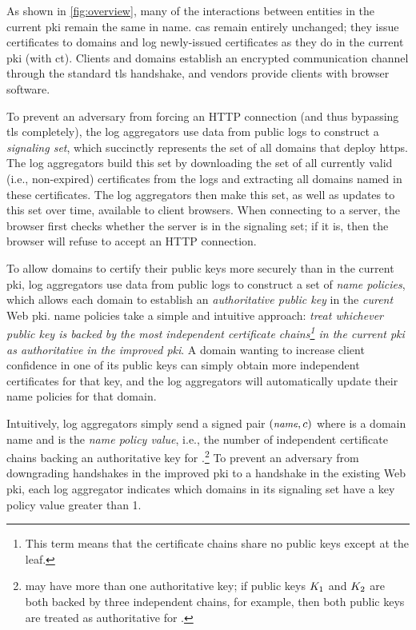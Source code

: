 As shown in \autoref{fig:overview}, many of the interactions between entities in
the current \ac{pki} remain the same in \ac{name}. \acp{ca} remain entirely unchanged;
they issue certificates
to domains and log newly-issued certificates as they do in the current \ac{pki}
(with \ac{ct}). Clients and domains establish an encrypted communication channel
through the standard \ac{tls} handshake, and vendors provide clients with browser
software.

To prevent an adversary from forcing an HTTP connection (and thus bypassing \ac{tls}
completely), the log aggregators use data from public logs to construct a
\emph{signaling set}, which succinctly represents the set of all domains that
deploy \ac{https}. The log aggregators build this set by downloading the set of
all currently valid (i.e., non-expired) certificates from the logs and
extracting all domains named in these certificates. The log aggregators then
make this set, as well as updates to this set over time, available to client
browsers.  When connecting to a server, the browser first checks whether
the server is in the signaling set; if it is, then the browser will refuse
to accept an HTTP connection.

To allow domains to certify their public keys more securely than in the current
\ac{pki}, log aggregators use data from public logs to construct a set of
\emph{\ac{name} policies}, which allows each domain to establish an
\emph{authoritative public key} in the \emph{curent} Web \ac{pki}. \ac{name}
policies take a simple and intuitive approach: \emph{treat whichever public key
  is backed by the most independent certificate chains\footnote{This term means
  that the certificate chains share no public keys except at the leaf.} in the
current \ac{pki} as authoritative in the improved \ac{pki}}. A domain wanting to
increase client confidence in one of its public keys can simply obtain more
independent certificates for that key, and the log aggregators will
automatically update their \ac{name} policies for that domain.

Intuitively, log aggregators simply send a signed pair $(\small{\emph{name}}, c)$
where \hostname is a domain name and \policy is the \emph{\ac{name} policy
  value}, i.e., the number of independent certificate chains backing an authoritative
  key for \hostname.\footnote{\hostname may have more than one authoritative
  key; if public keys $K_1$ and $K_2$ are both backed by three independent
chains, for example, then both public keys are treated as authoritative
for \hostname.} To prevent an adversary from downgrading handshakes in the
improved \ac{pki} to a handshake in the existing Web \ac{pki}, each log
aggregator indicates which domains in its signaling set have a key policy value
greater than 1.

